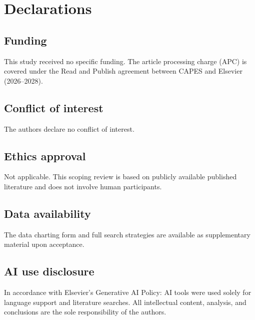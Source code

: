 \documentclass[a4paper,fleqn]{cas-sc}
\begin{document}

\section*{Declarations}

\subsection*{Funding}
This study received no specific funding.
The article processing charge (APC) is covered under the Read and Publish
agreement between CAPES and Elsevier (2026--2028).

\subsection*{Conflict of interest}
The authors declare no conflict of interest.

\subsection*{Ethics approval}
Not applicable. This scoping review is based on publicly available
published literature and does not involve human participants.

\subsection*{Data availability}
The data charting form and full search strategies are available as
supplementary material upon acceptance.

\subsection*{AI use disclosure}
In accordance with Elsevier's Generative AI Policy: AI tools were used
solely for language support and literature searches. All intellectual
content, analysis, and conclusions are the sole responsibility of the
authors.

\printcredits
\end{document}
